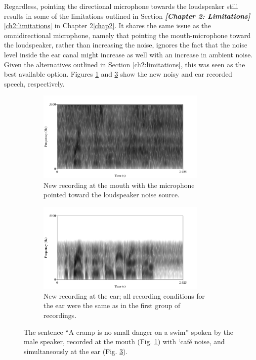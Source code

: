 \documentclass[dissertation,copyright]{uathesis}
\begin{document}
Regardless, pointing the directional microphone towards the loudspeaker still results in some of the limitations outlined in Section \textit{\textbf{[Chapter 2: Limitations]}}\ref{ch2:limitations} in Chapter 2\ref{chap2}.  It shares the same issue as the omnidirectional microphone, namely that pointing the mouth-microphone toward the loudspeaker, rather than increasing the noise, ignores the fact that the noise level inside the ear canal might increase as well with an increase in ambient noise.  Given the alternatives outlined in Section \ref{ch2:limitations}, this was seen as the best available option.  Figures \ref{fig:spectNewMouthNoise} and \ref{fig:spectNewEarNoise} show the new noisy and ear recorded speech, respectively.
%
\begin{figure}
\begin{subfigure}{0.5\textwidth}
  \centering
  \includegraphics[width=0.9\textwidth]{figure/spectNewMouthNoise.png}
  \caption{New recording at the mouth with the microphone pointed toward the loudspeaker noise source.}
  \label{fig:spectNewMouthNoise}
\end{subfigure}
%
\begin{subfigure}{0.5\textwidth}
  \centering
  \includegraphics[width=0.9\textwidth]{figure/spectNewEarNoise.png}
  \caption{New recording at the ear; all recording conditions for the ear were the same as in the first group of recordings.}
  \label{fig:spectNewEarNoise}
\end{subfigure}
\caption{The sentence ``A cramp is no small danger on a swim'' spoken by the male speaker, recorded at the mouth (Fig. \ref{fig:spectNewMouthNoise}) with `caf\'{e} noise, and simultaneously at the ear (Fig. \ref{fig:spectNewEarNoise}).}
\end{figure}
\end{document}
